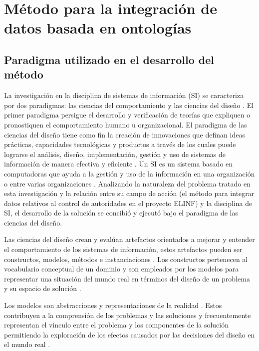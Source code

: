 \chapter{\large Método para la integración de datos basada en ontologías}


\pagestyle{fancy}
\lhead{}
\chead{}
\lfoot{}
\cfoot{}
\rfoot{\thepage}
\renewcommand{\headrulewidth}{0.4pt}
 \vspace{-1cm}

\section{Paradigma utilizado en el desarrollo del método}
La investigación en la disciplina de sistemas de información (SI) se caracteriza por dos paradigmas: las ciencias del comportamiento y las ciencias del diseño \citep{Hevner:2004:DSI:2017212.2017217}. El primer paradigma persigue el desarrollo y verificación de teorías que expliquen o pronostiquen el comportamiento humano u organizacional. El paradigma de las ciencias del diseño tiene como fin la creación de innovaciones que definan ideas prácticas, capacidades tecnológicas y productos a través de los cuales puede lograrse el análisis, diseño, implementación, gestión y uso de sistemas de información de manera efectiva y eficiente \citep{Denning:1997:NSC:253671.253755}. Un SI es un sistema basado en computadoras que ayuda a la gestión y uso de la información en una organización o entre varias organizaciones \citep{GarciaNoguera2009}. Analizando la naturaleza del problema tratado en esta investigación y la relación entre su campo de acción (el método para integrar datos relativos al control de autoridades en el proyecto ELINF) y la disciplina de SI, el desarrollo de la solución se concibió y ejecutó bajo el paradigma de las ciencias del diseño.

Las ciencias del diseño crean y evalúan artefactos orientados a mejorar y entender el comportamiento de los sistemas de información, estos artefactos pueden ser constructos, modelos, métodos e instanciaciones \citep{March:1995:DNS:1700865.1700867}. Los constructos pertenecen al vocabulario conceptual de un dominio y son empleados por los modelos para representar una situación del mundo real en términos del diseño de un problema y su espacio de solución \citep{Simon:1996:SA:237774}. 

Los modelos son abstracciones y representaciones de la realidad \citep{Hevner:2004:DSI:2017212.2017217}. Estos contribuyen a la comprensión de los problemas y las soluciones y frecuentemente representan el vínculo entre el problema y los componentes de la solución permitiendo la exploración de los efectos causados por las decisiones del diseño en el mundo real \citep{Hevner:2004:DSI:2017212.2017217}.


